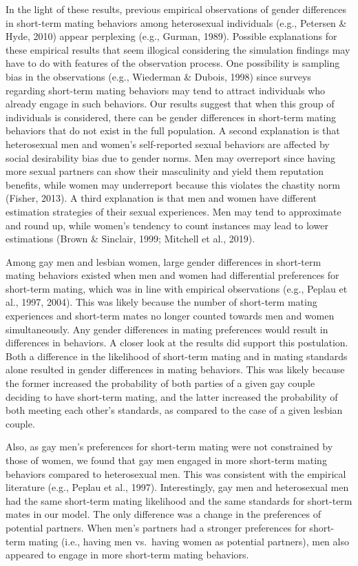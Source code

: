 \documentclass[
  11pt,
]{article}
\begin{document}
In the light of these results, previous empirical observations of gender
differences in short-term mating behaviors among heterosexual
individuals (e.g., Petersen \& Hyde, 2010) appear perplexing (e.g.,
Gurman, 1989). Possible explanations for these empirical results that
seem illogical considering the simulation findings may have to do with
features of the observation process. One possibility is sampling bias in
the observations (e.g., Wiederman \& Dubois, 1998) since surveys
regarding short-term mating behaviors may tend to attract individuals
who already engage in such behaviors. Our results suggest that when this
group of individuals is considered, there can be gender differences in
short-term mating behaviors that do not exist in the full population. A
second explanation is that heterosexual men and women's self-reported
sexual behaviors are affected by social desirability bias due to gender
norms. Men may overreport since having more sexual partners can show
their masculinity and yield them reputation benefits, while women may
underreport because this violates the chastity norm (Fisher, 2013). A
third explanation is that men and women have different estimation
strategies of their sexual experiences. Men may tend to approximate and
round up, while women's tendency to count instances may lead to lower
estimations (Brown \& Sinclair, 1999; Mitchell et al., 2019).

Among gay men and lesbian women, large gender differences in short-term
mating behaviors existed when men and women had differential preferences
for short-term mating, which was in line with empirical observations
(e.g., Peplau et al., 1997, 2004). This was likely because the number of
short-term mating experiences and short-term mates no longer counted
towards men and women simultaneously. Any gender differences in mating
preferences would result in differences in behaviors. A closer look at
the results did support this postulation. Both a difference in the
likelihood of short-term mating and in mating standards alone resulted
in gender differences in mating behaviors. This was likely because the
former increased the probability of both parties of a given gay couple
deciding to have short-term mating, and the latter increased the
probability of both meeting each other's standards, as compared to the
case of a given lesbian couple.

Also, as gay men's preferences for short-term mating were not
constrained by those of women, we found that gay men engaged in more
short-term mating behaviors compared to heterosexual men. This was
consistent with the empirical literature (e.g., Peplau et al., 1997).
Interestingly, gay men and heterosexual men had the same short-term
mating likelihood and the same standards for short-term mates in our
model. The only difference was a change in the preferences of potential
partners. When men's partners had a stronger preferences for short-term
mating (i.e., having men vs.~having women as potential partners), men
also appeared to engage in more short-term mating behaviors.
\end{document}
